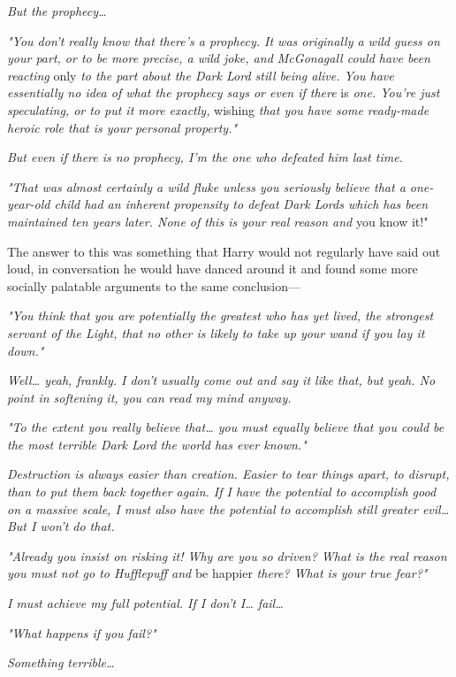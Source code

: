\emph{But the prophecy{\ldots}}

\emph{"You don't really know that there's a prophecy. It was originally a wild guess on your part, or to be more precise, a wild joke, and McGonagall could have been reacting} only\emph{ to the part about the Dark Lord still being alive. You have essentially no idea of what the prophecy says or even if there} is\emph{ one. You're just speculating, or to put it more exactly,} wishing \emph{that you have some ready-made heroic role that is your personal property."}

\emph{But even if there is no prophecy, I'm the one who defeated him last time.}

\emph{"That was almost certainly a wild fluke unless you seriously believe that a one-year-old child had an inherent propensity to defeat Dark Lords which has been maintained ten years later. None of this is your real reason and} you know it!"

The answer to this was something that Harry would not regularly have said out loud, in conversation he would have danced around it and found some more socially palatable arguments to the same conclusion---

\emph{"You think that you are potentially the greatest who has yet lived, the strongest servant of the Light, that no other is likely to take up your wand if you lay it down."}

\emph{Well{\ldots} yeah, frankly. I don't usually come out and say it like that, but yeah. No point in softening it, you can read my mind anyway.}

\emph{"To the extent you really believe that{\ldots} you must equally believe that you could be the most terrible Dark Lord the world has ever known."}

\emph{Destruction is always easier than creation. Easier to tear things apart, to disrupt, than to put them back together again. If I have the potential to accomplish good on a massive scale, I must also have the potential to accomplish still greater evil{\ldots} But I won't do that.}

\emph{"Already you insist on risking it! Why are you so driven? What is the real reason you must not go to Hufflepuff and} be happier\emph{ there? What is your true fear?"}

\emph{I must achieve my full potential. If I don't I{\ldots} fail{\ldots}}

\emph{"What happens if you fail?"}

\emph{Something terrible{\ldots}}

